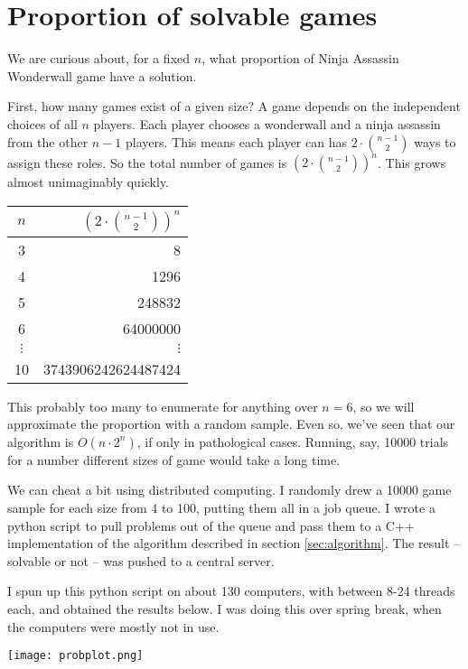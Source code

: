 \documentclass[12pt]{article}
\begin{document}
\section{Proportion of solvable games}
    \label{sec:prob}
    We are curious about, for a fixed $n$, what proportion of Ninja Assassin Wonderwall game have a solution. 

    First, how many games exist of a given size? A game depends on the independent choices of all $n$ players. Each player chooses a wonderwall and a ninja assassin from the other $n-1$ players. This means each player can has $2\cdot \binom{n-1}{2}$ ways to assign these roles. So the total number of games is $\displaystyle \left(2 \cdot \binom{n-1}{2}\right)^n$. This grows almost unimaginably quickly. 
    \begin{center}
        \begin{tabular}{c | r}
        $n$ & $\displaystyle \left(2 \cdot \binom{n-1}{2}\right)^n$\\
        \hline
        3 & 8\\
        4 & 1296 \\
        5 & 248832 \\
        6 & 64000000\\
        $\vdots$ & $\vdots$ \\
        10 & 3743906242624487424
        \end{tabular}
    \end{center}
    This probably too many to enumerate for anything over $n=6$, so we will approximate the proportion with a random sample. Even so, we've seen that our algorithm is $O(n\cdot 2^n)$, if only in pathological cases. Running, say, 10000 trials for a number different sizes of game would take a long time.

    We can cheat a bit using distributed computing. I randomly drew a 10000 game sample for each size from 4 to 100, putting them all in a job queue. I wrote a python script to pull problems out of the queue and pass them to a C++ implementation of the algorithm described in section \ref{sec:algorithm}. The result -- solvable or not -- was pushed to a central server. 

    I spun up this python script on about 130 computers, with between 8-24 threads each, and obtained the results below. I was doing this over spring break, when the computers were mostly not in use.

    \begin{center}
    \texttt{[image: probplot.png]}
    \end{center}
\end{document}
